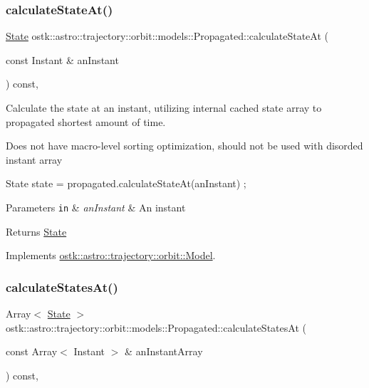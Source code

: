 \subsubsection{\texorpdfstring{calculate\+State\+At()}{calculateStateAt()}}
{\footnotesize\ttfamily \hyperlink{classostk_1_1astro_1_1trajectory_1_1_state}{State} ostk\+::astro\+::trajectory\+::orbit\+::models\+::\+Propagated\+::calculate\+State\+At (\begin{DoxyParamCaption}\item[{const Instant \&}]{an\+Instant }\end{DoxyParamCaption}) const\hspace{0.3cm}{\ttfamily [override]}, {\ttfamily [virtual]}}



Calculate the state at an instant, utilizing internal cached state array to propagated shortest amount of time. 

Does not have macro-\/level sorting optimization, should not be used with disorded instant array 
\begin{DoxyCode}
State state = propagated.calculateStateAt(anInstant) ;
\end{DoxyCode}
 
\begin{DoxyParams}[1]{Parameters}
\mbox{\tt in}  & {\em an\+Instant} & An instant \\
\hline
\end{DoxyParams}
\begin{DoxyReturn}{Returns}
\hyperlink{classostk_1_1astro_1_1trajectory_1_1_state}{State} 
\end{DoxyReturn}


Implements \hyperlink{classostk_1_1astro_1_1trajectory_1_1orbit_1_1_model_a34a0d8979ec1f7ade3e434fc0dad3711}{ostk\+::astro\+::trajectory\+::orbit\+::\+Model}.

\mbox{\label{classostk_1_1astro_1_1trajectory_1_1orbit_1_1models_1_1_propagated_a9a4097432d2c863aedead23d2d67a7a7}} 
\subsubsection{\texorpdfstring{calculate\+States\+At()}{calculateStatesAt()}}
{\footnotesize\ttfamily Array$<$ \hyperlink{classostk_1_1astro_1_1trajectory_1_1_state}{State} $>$ ostk\+::astro\+::trajectory\+::orbit\+::models\+::\+Propagated\+::calculate\+States\+At (\begin{DoxyParamCaption}\item[{const Array$<$ Instant $>$ \&}]{an\+Instant\+Array }\end{DoxyParamCaption}) const\hspace{0.3cm}{\ttfamily [override]}, {\ttfamily [virtual]}}



